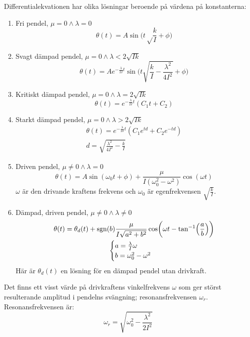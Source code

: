 \documentclass[12pt, a4paper]{article}
\DeclareMathOperator{\sgn}{sgn}
\begin{document}
Differentialekvationen har olika lösningar beroende på värdena på konstanterna:
\begin{enumerate}
	\item Fri pendel, $\mu=0\land\lambda=0$
	\begin{equation}\label{eq:fri_pendel}
		\theta(t)=A\sin\biggl(t\sqrt\frac{k}{I}+\phi\biggr)
	\end{equation}
	\item Svagt dämpad pendel, $\mu=0\land\lambda<2\sqrt{Ik}$
	\begin{equation}\label{eq:svagt_dämpad}
		\theta(t)=Ae^{-\frac{\lambda}{2I}t}\sin\biggl(t\sqrt{\frac{k}{I}-\frac{\lambda^2}{4I^2}}+\phi\biggr)
	\end{equation}
	\item Kritiskt dämpad pendel, $\mu=0\land\lambda=2\sqrt{Ik}$
	\begin{equation*}
		\theta(t)=e^{-\frac{\lambda}{2I}t}\left(C_1t+C_2\right)
	\end{equation*}
	\item Starkt dämpad pendel, $\mu=0\land\lambda>2\sqrt{Ik}$
	\begin{equation}\label{eq:starkt_dämpad}
		\begin{gathered}
			\theta(t)=e^{-\frac{\lambda}{2I}t}\left(C_1e^{td}+C_2e^{-td}\right)\\
			d=\sqrt{\frac{\lambda^2}{4I^2}-\frac{k}{I}}
		\end{gathered}
	\end{equation}
	\item Driven pendel, $\mu\neq0\land\lambda=0$
	\begin{equation}\label{eq:driven}
		\theta(t)=A\sin(\omega_0t+\phi)+\frac{\mu}{I(\omega_0^2-\omega^2)}\cos(\omega t)
	\end{equation}
	$\omega$ är den drivande kraftens frekvens och $\omega_0$ är egenfrekvensen $\sqrt{\frac{k}{I}}$.
	\item Dämpad, driven pendel, $\mu\neq0\land\lambda\neq0$
	\begin{equation}\label{eq:dämpad_driven}
		\begin{gathered}
			\theta(t)=\theta_d(t)+\sgn(b)\frac{\mu}{I\sqrt{a^2+b^2}}\cos\biggl(\omega t-\tan^{-1}\Bigl(\frac{a}{b}\Bigr)\biggr)\\
			\begin{cases}
				a=\frac{\lambda}{I}\omega\\
				b=\omega_0^2-\omega^2
			\end{cases}
		\end{gathered}        
	\end{equation}
	Här är $\theta_d(t)$ en lösning för en dämpad pendel utan drivkraft. 
\end{enumerate}
Det finns ett visst värde på drivkraftens vinkelfrekvens $\omega$ som ger störst resulterande amplitud i pendelns svängning; resonansfrekvensen $\omega_r$. Resonansfrekvensen är:
\begin{equation}\label{eq:resonansfrekvens}
	\omega_r=\sqrt{\omega_0^2-\frac{\lambda^2}{2I^2}}
\end{equation}
\end{document}
